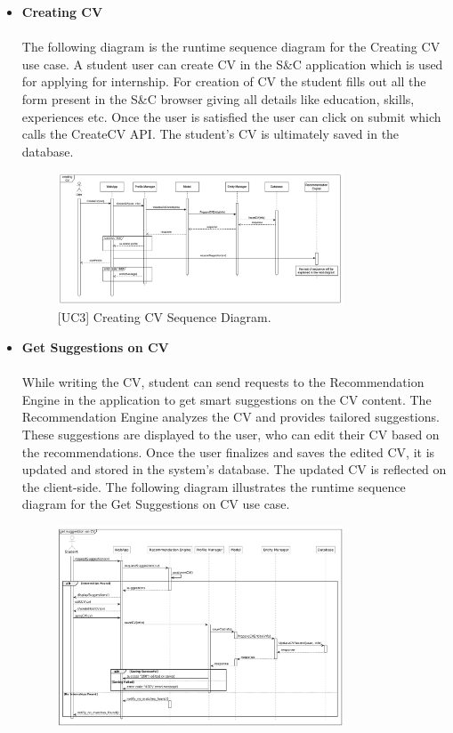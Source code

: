 \begin{itemize}
\begin{figure}[H]
    \caption{\label{fig:metamodel9}[UC2] Log In Sequence Diagram.}
    \end{figure}
    \item \textbf{Creating CV} \\ \\
    The following diagram is the runtime sequence diagram for the Creating CV use case. A student user can create CV in the S\&C application which is used for applying for internship. For creation of CV the student fills out all the form present in the S\&C browser giving all details like education, skills, experiences etc. Once the user is satisfied the user can click on submit which calls the CreateCV API. The student's CV is ultimately saved in the database.
    \begin{figure}[H]
    \centering
    \includegraphics[width=0.8\textwidth]{Images/Creating_CV_Sequence_Diagram.png}
    \caption{\label{fig:metamodel9}[UC3] Creating CV Sequence Diagram.}
    \end{figure}
    \clearpage
    \item \textbf{Get Suggestions on CV} \\ \\
    While writing the CV, student can send requests to the Recommendation Engine in the application to get smart suggestions on the CV content. The Recommendation Engine analyzes the CV and provides tailored suggestions. These suggestions are displayed to the user, who can edit their CV based on the recommendations. Once the user finalizes and saves the edited CV, it is updated and stored in the system's database. The updated CV is reflected on the client-side. The following diagram illustrates the runtime sequence diagram for the Get Suggestions on CV use case.
    \begin{figure}[H]
    \centering
    \includegraphics[width=0.8\textwidth]{Images/CV_Suggestion_Sequence_Diagram.png}

\end{figure}
\end{itemize}
